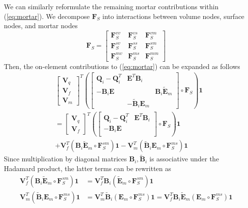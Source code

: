 \documentclass[review]{siamart0216}
\renewcommand{\tilde}{\widetilde}
\newcommand{\LRp}[1]{\left( #1 \right)}
\begin{document}
We can similarly reformulate the remaining mortar contributions within (\ref{eq:mortar}).  We decompose $\bm{F}_S$ into interactions between volume nodes, surface nodes, and mortar nodes
\[
\bm{F}_S = \begin{bmatrix}
\bm{F}_S^{vv} & \bm{F}_S^{vs} & \bm{F}_S^{vm}\\
\bm{F}_S^{sv} & \bm{F}_S^{ss} & \bm{F}_S^{sm}\\
\bm{F}_S^{mv} & \bm{F}_S^{ms} & \bm{F}_S^{mm}
\end{bmatrix}
\]
Then, the on-element contributions to (\ref{eq:mortar}) can be expanded as follows
\begin{align*}
&\begin{bmatrix} \bm{V}_q \\ \bm{V}_f \\ \bm{V}_m \end{bmatrix}^T
\LRp{\begin{bmatrix}
\bm{Q}_i-\bm{Q}_i^T & \bm{E}^T\bm{B}_i &\\
-\bm{B}_i\bm{E} &  & \bm{B}_i\tilde{\bm{E}}_m \\
& -\tilde{\bm{B}}_i{\bm{E}}_m & 
\end{bmatrix} \circ \bm{F}_S}\bm{1} \\
&= 
\begin{bmatrix} \bm{V}_q \\ \bm{V}_f \end{bmatrix}^T
\LRp{\begin{bmatrix}
\bm{Q}_i-\bm{Q}_i^T & \bm{E}^T\bm{B}_i\\
-\bm{B}_i\bm{E} & \\
\end{bmatrix} \circ \bm{F}_S}\bm{1} \\
&+ \bm{V}_f^T \LRp{\bm{B}_i\tilde{\bm{E}}_m\circ \bm{F}_S^{sm}}\bm{1} - \bm{V}_m^T \LRp{ \tilde{\bm{B}}_i\bm{E}_m \circ \bm{F}_S^{ms}}\bm{1}
\end{align*}
Since multiplication by diagonal matrices $\bm{B}_i, \tilde{\bm{B}}_i$ is associative under the Hadamard product, the latter terms can be rewritten as 
\begin{align*}
 \bm{V}_f^T \LRp{\bm{B}_i\tilde{\bm{E}}_m\circ \bm{F}_S^{sm}}\bm{1} &=  \bm{V}_f^T \bm{B}_i \LRp{\tilde{\bm{E}}_m\circ \bm{F}_S^{sm}}\bm{1}\\
\bm{V}_m^T \LRp{ \tilde{\bm{B}}_i\bm{E}_m \circ \bm{F}_S^{ms}}\bm{1} &= \bm{V}_m^T \tilde{\bm{B}}_i \LRp{ \bm{E}_m \circ \bm{F}_S^{ms}}\bm{1} = \bm{V}_f^T \bm{B}_i \tilde{\bm{E}}_m \LRp{ \bm{E}_m \circ \bm{F}_S^{ms}}\bm{1} 
\end{align*}
\end{document}
